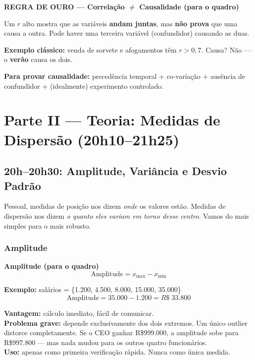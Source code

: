 \begin{BoardBox}
\textbf{REGRA DE OURO — Correlação $\neq$ Causalidade (para o quadro)}

Um $r$ alto mostra que as variáveis \textbf{andam juntas}, mas \textbf{não
prova} que uma causa a outra. Pode haver uma terceira variável (confundidor)
causando as duas.

\textbf{Exemplo clássico:} venda de sorvete e afogamentos têm $r > 0{,}7$.
Causa? Não — o \textbf{verão} causa os dois.

\textbf{Para provar causalidade:} precedência temporal + co-variação +
ausência de confundidor + (idealmente) experimento controlado.
\end{BoardBox}

\section{Parte II — Teoria: Medidas de Dispersão (20h10–21h25)}

\subsection{20h–20h30: Amplitude, Variância e Desvio Padrão}

Pessoal, medidas de posição nos dizem \emph{onde} os valores estão.
Medidas de dispersão nos dizem \emph{o quanto eles variam em torno desse centro}.
Vamos do mais simples para o mais robusto.

\subsubsection*{Amplitude}

\begin{BoardBox}
\textbf{Amplitude (para o quadro)}
\[
\text{Amplitude} = x_{\max} - x_{\min}
\]

\textbf{Exemplo:} salários = \{1.200, 4.500, 8.000, 15.000, 35.000\}
\[
\text{Amplitude} = 35.000 - 1.200 = R\$\;33.800
\]

\textbf{Vantagem:} cálculo imediato, fácil de comunicar.\\
\textbf{Problema grave:} depende exclusivamente dos dois extremos. Um único
outlier distorce completamente. Se o CEO ganhar R\$999.000, a amplitude sobe
para R\$997.800 — mas nada mudou para os outros quatro funcionários.\\
\textbf{Uso:} apenas como primeira verificação rápida. Nunca como única medida.
\end{BoardBox}

